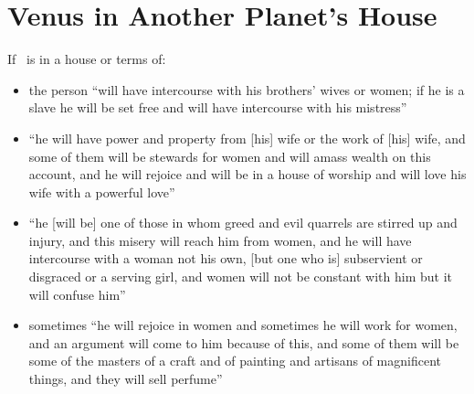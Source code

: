 \section{Venus in Another Planet's House}
If \Venus\, is in a house or terms of:
\begin{itemize}[topsep=0em,itemsep=0em]
\item[\Saturn] the person ``will have intercourse with his brothers' wives or women; if he is a slave he will be set free and will have intercourse with his mistress''

\item[\Jupiter] ``he will have power and property from [his] wife or the work of [his] wife, and some of them will be stewards for women and will amass wealth on this account, and he will rejoice and will be in a house of worship and will love his wife with a powerful love''

\item[\Mars] ``he [will be] one of those in whom greed and evil quarrels are stirred up and injury, and this misery will reach him from women, and he will have intercourse with a woman not his own, [but one who is] subservient or disgraced or a serving girl, and women will not be constant with him but it will confuse him''

\item[\Mercury] sometimes ``he will rejoice in women and sometimes he will work for women, and an argument will come to him because of this, and some of them will be some of the masters of a craft and of painting and artisans of magnificent things, and they will sell perfume''


\end{itemize}
